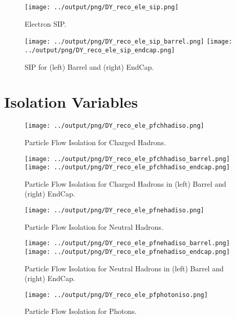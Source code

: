 \documentclass[11pt]{book}
\begin{document}
\begin{figure}[ht]
\centering
\texttt{[image: ../output/png/DY\_reco\_ele\_sip.png]}
\caption{Electron SIP.}
\label{fig:dy_reco_ele_sip}
\end{figure}

\begin{figure}[ht]
\centering
\texttt{[image: ../output/png/DY\_reco\_ele\_sip\_barrel.png]}
\texttt{[image: ../output/png/DY\_reco\_ele\_sip\_endcap.png]}
\caption{SIP for (left) Barrel and (right) EndCap.}
\label{fig:dy_reco_ele_sip_regions}
\end{figure}
\clearpage

\section{Isolation Variables}

\begin{figure}[ht]
\centering
\texttt{[image: ../output/png/DY\_reco\_ele\_pfchhadiso.png]}
\caption{Particle Flow Isolation for Charged Hadrons.}
\label{fig:dy_reco_ele_pfchhadiso}
\end{figure}

\begin{figure}[ht]
\centering
\texttt{[image: ../output/png/DY\_reco\_ele\_pfchhadiso\_barrel.png]}
\texttt{[image: ../output/png/DY\_reco\_ele\_pfchhadiso\_endcap.png]}
\caption{Particle Flow Isolation for Charged Hadrons in (left) Barrel and (right) EndCap.}
\label{fig:dy_reco_ele_pfchhadiso_regions}
\end{figure}

\begin{figure}[ht]
\centering
\texttt{[image: ../output/png/DY\_reco\_ele\_pfnehadiso.png]}
\caption{Particle Flow Isolation for Neutral Hadrons.}
\label{fig:dy_reco_ele_pfnehadiso}
\end{figure}

\begin{figure}[ht]
\centering
\texttt{[image: ../output/png/DY\_reco\_ele\_pfnehadiso\_barrel.png]}
\texttt{[image: ../output/png/DY\_reco\_ele\_pfnehadiso\_endcap.png]}
\caption{Particle Flow Isolation for Neutral Hadrons in (left) Barrel and (right) EndCap.}
\label{fig:dy_reco_ele_pfnehadiso_regions}
\end{figure}

\begin{figure}[ht]
\centering
\texttt{[image: ../output/png/DY\_reco\_ele\_pfphotoniso.png]}
\caption{Particle Flow Isolation for Photons.}
\label{fig:dy_reco_ele_pfphotoniso}
\end{figure}
\end{document}
